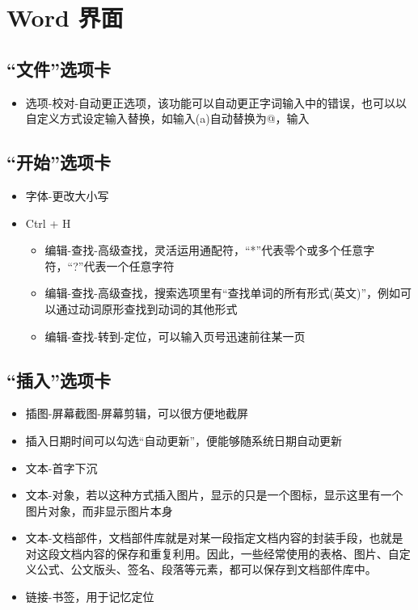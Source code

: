\documentclass[]{ctexbook}
\providecommand{\tightlist}{%
  \setlength{\itemsep}{0pt}\setlength{\parskip}{0pt}}
\begin{document}
\hypertarget{chapter-word-interface}{%
\chapter{Word 界面}\label{chapter-word-interface}}

\hypertarget{ux6587ux4ef6ux9009ux9879ux5361}{%
\section{``文件''选项卡}\label{ux6587ux4ef6ux9009ux9879ux5361}}

\begin{itemize}
\tightlist
\item
  选项-校对-自动更正选项，该功能可以自动更正字词输入中的错误，也可以以自定义方式设定输入替换，如输入(a)自动替换为@，输入
\end{itemize}

\hypertarget{ux5f00ux59cbux9009ux9879ux5361}{%
\section{``开始''选项卡}\label{ux5f00ux59cbux9009ux9879ux5361}}

\begin{itemize}
\tightlist
\item
  字体-更改大小写\\
\item
  Ctrl + H

  \begin{itemize}
  \tightlist
  \item
    编辑-查找-高级查找，灵活运用通配符，``*''代表零个或多个任意字符，``?''代表一个任意字符\\
  \item
    编辑-查找-高级查找，搜索选项里有``查找单词的所有形式(英文)''，例如可以通过动词原形查找到动词的其他形式
  \item
    编辑-查找-转到-定位，可以输入页号迅速前往某一页
  \end{itemize}
\end{itemize}

\hypertarget{ux63d2ux5165ux9009ux9879ux5361}{%
\section{``插入''选项卡}\label{ux63d2ux5165ux9009ux9879ux5361}}

\begin{itemize}
\tightlist
\item
  插图-屏幕截图-屏幕剪辑，可以很方便地截屏
\item
  插入日期时间可以勾选``自动更新''，便能够随系统日期自动更新
\item
  文本-首字下沉
\item
  文本-对象，若以这种方式插入图片，显示的只是一个图标，显示这里有一个图片对象，而非显示图片本身
\item
  文本-文档部件，文档部件库就是对某一段指定文档内容的封装手段，也就是对这段文档内容的保存和重复利用。因此，一些经常使用的表格、图片、自定义公式、公文版头、签名、段落等元素，都可以保存到文档部件库中。
\item
  链接-书签，用于记忆定位
\end{itemize}
\end{document}
